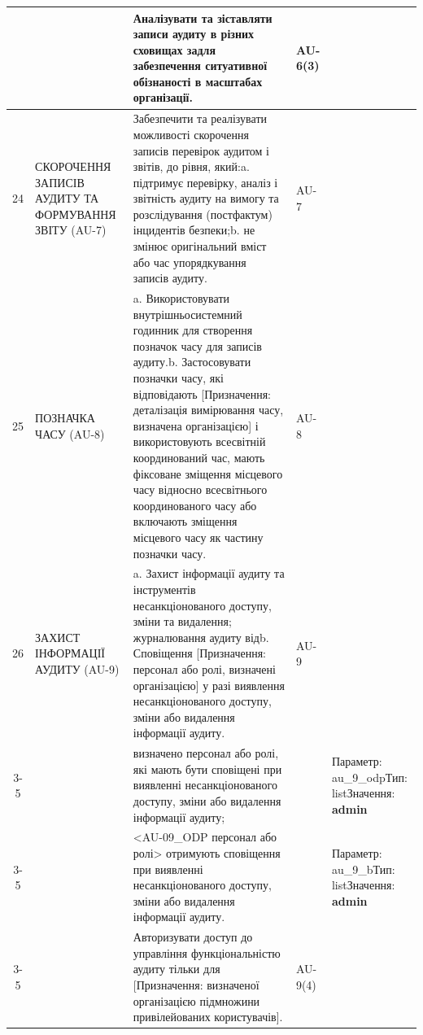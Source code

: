 \documentclass[10pt]{article}
\begin{document}
\begin{longtable}{|c|>{\raggedright\arraybackslash}p{4cm}|>{\raggedright\arraybackslash}p{6cm}|>{\raggedright\arraybackslash}p{1.5cm}|>{\raggedright\arraybackslash}p{3.5cm}|}
 &  & Аналізувати та зіставляти записи аудиту в різних сховищах задля забезпечення ситуативної обізнаності в масштабах організації. & AU-6(3) & \\ \hline
24 & СКОРОЧЕННЯ ЗАПИСІВ АУДИТУ ТА ФОРМУВАННЯ ЗВІТУ (AU-7) & Забезпечити та реалізувати можливості скорочення записів перевірок аудитом і звітів, до рівня, який:\newline a. підтримує перевірку, аналіз і звітність аудиту на вимогу та розслідування (постфактум) інцидентів безпеки;\newline b. не змінює оригінальний вміст або час упорядкування записів аудиту. & AU-7 & \\ \hline
25 & ПОЗНАЧКА ЧАСУ (AU-8) & a. Використовувати внутрішньосистемний годинник для створення позначок часу для записів аудиту.\newline b. Застосовувати позначки часу, які відповідають [Призначення: деталізація вимірювання часу, визначена організацією] і використовують всесвітній координований час, мають фіксоване зміщення місцевого часу відносно всесвітнього координованого часу або включають зміщення місцевого часу як частину позначки часу. & AU-8 & \\ \hline
26 & ЗАХИСТ ІНФОРМАЦІЇ АУДИТУ (AU-9) & a. Захист інформації аудиту та інструментів несанкціонованого доступу, зміни та видалення; журналювання аудиту від\newline b. Сповіщення [Призначення: персонал або ролі, визначені організацією] у разі виявлення несанкціонованого доступу, зміни або видалення інформації аудиту. & AU-9 & \\ \cline{3-5}
 &  & визначено персонал або ролі, які мають бути сповіщені при виявленні несанкціонованого доступу, зміни або видалення інформації аудиту; &  & Параметр: au\_\allowbreak{}9\_\allowbreak{}odp\newline Тип: list\newline Значення: \textbf{admin} \\ \cline{3-5}
 &  & <AU-09\_\allowbreak{}ODP персонал або ролі>  отримують сповіщення при виявленні несанкціонованого доступу, зміни або видалення інформації аудиту. &  & Параметр: au\_\allowbreak{}9\_\allowbreak{}b\newline Тип: list\newline Значення: \textbf{admin} \\ \cline{3-5}
 &  & Авторизувати доступ до управління функціональністю аудиту тільки для [Призначення: визначеної організацією підмножини привілейованих користувачів]. & AU-9(4) & \\ \hline

\end{longtable}
\end{document}

